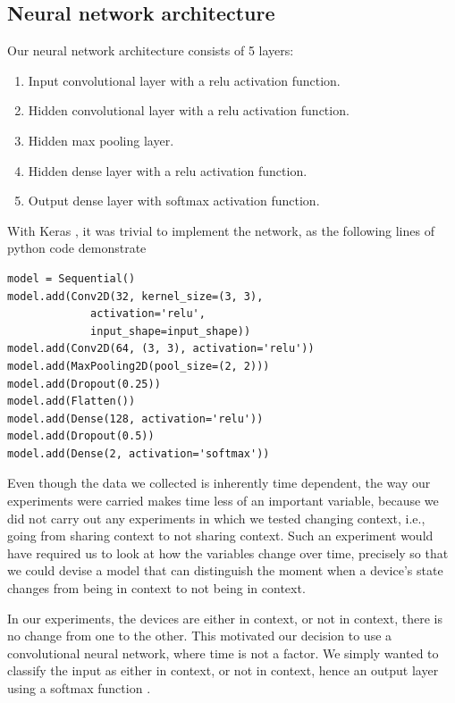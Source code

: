 \documentclass[journal]{IEEEtranTIE}
\begin{document}
\subsection{Neural network architecture}

Our neural network architecture consists of 5 layers:

\begin{enumerate}
\item Input convolutional layer with a relu activation function.
\item Hidden convolutional layer with a relu activation function.
\item Hidden max pooling layer.
\item Hidden dense layer with a relu activation function.
\item Output dense layer with softmax activation function.
\end{enumerate}

With Keras \cite{Keras}, it was trivial to implement the network, as the
following lines of python code demonstrate

\begin{lstlisting}
model = Sequential()
model.add(Conv2D(32, kernel_size=(3, 3),
             activation='relu',
             input_shape=input_shape))
model.add(Conv2D(64, (3, 3), activation='relu'))
model.add(MaxPooling2D(pool_size=(2, 2)))
model.add(Dropout(0.25))
model.add(Flatten())
model.add(Dense(128, activation='relu'))
model.add(Dropout(0.5))
model.add(Dense(2, activation='softmax'))
\end{lstlisting}

Even though the data we collected is inherently time dependent, the way our
experiments were carried makes time less of an important variable, because we
did not carry out any experiments in which we tested changing context, i.e.,
going from sharing context to not sharing context. Such an experiment would have
required us to look at how the variables change over time, precisely so that we
could devise a model that can distinguish the moment when a device's state
changes from being in context to not being in context.

In our experiments, the devices are either in context, or not in context, there
is no change from one to the other. This motivated our decision to use a
convolutional neural network, where time is not a factor. We simply wanted to
classify the input as either in context, or not in context, hence an output
layer using a softmax function \cite{DeepLearning,LeCunn}.
\end{document}

